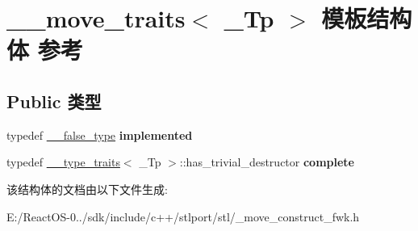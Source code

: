 \hypertarget{struct____move__traits}{}\section{\+\_\+\+\_\+move\+\_\+traits$<$ \+\_\+\+Tp $>$ 模板结构体 参考}
\label{struct____move__traits}
\subsection*{Public 类型}
\begin{DoxyCompactItemize}
\item 
\mbox{\label{struct____move__traits_a63a01cc3d40276b295a3905bd344d29f}} 
typedef \hyperlink{struct____false__type}{\+\_\+\+\_\+false\+\_\+type} {\bfseries implemented}
\item 
\mbox{\label{struct____move__traits_a4775a0a154f8b016f3c1ecacab5e2973}} 
typedef \hyperlink{struct____type__traits}{\+\_\+\+\_\+type\+\_\+traits}$<$ \+\_\+\+Tp $>$\+::has\+\_\+trivial\+\_\+destructor {\bfseries complete}
\end{DoxyCompactItemize}


该结构体的文档由以下文件生成\+:\begin{DoxyCompactItemize}
\item 
E\+:/\+React\+O\+S-\/0../sdk/include/c++/stlport/stl/\+\_\+move\+\_\+construct\+\_\+fwk.\+h\end{DoxyCompactItemize}
